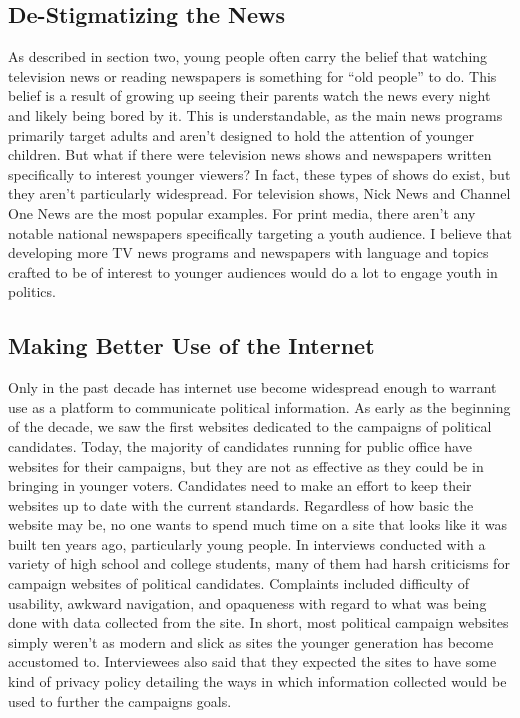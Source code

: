\documentclass[12pt,letterpaper]{article}
\begin{document}
\subsection{De-Stigmatizing the News}
As described in section two, young people often carry the belief that
watching television news or reading newspapers is something for ``old
people'' to do.  This belief is a result of growing up seeing their
parents watch the news every night and likely being bored by it.
This is understandable, as the main news programs primarily target
adults and aren't designed to hold the attention of younger children.
But what if there were television news shows and newspapers written
specifically to interest younger viewers?  In fact, these types of
shows do exist, but they aren't particularly widespread. For
television shows, Nick News and Channel One News are the most popular
examples.  For print media, there aren't any notable national
newspapers specifically targeting a youth audience. I believe that
developing more TV news programs and newspapers with language and
topics crafted to be of interest to younger audiences would do a lot
to engage youth in politics.  \cite{socia}

\subsection{Making Better Use of the Internet}
Only in the past decade has internet use become widespread enough to
warrant use as a platform to communicate political information.  As
early as the beginning of the decade, we saw the first websites
dedicated to the campaigns of political candidates.  Today, the
majority of candidates running for public office have websites for
their campaigns, but they are not as effective as they could be in
bringing in younger voters. Candidates need to make an effort to keep
their websites up to date with the current standards.  Regardless of
how basic the website may be, no one wants to spend much time on a
site that looks like it was built ten years ago, particularly young
people.  In interviews conducted with a variety of high school and
college students, many of them had harsh criticisms for campaign
websites of political candidates.  Complaints included difficulty of
usability, awkward navigation, and opaqueness with regard to what was
being done with data collected from the site.  In short, most
political campaign websites simply weren't as modern and slick as
sites the younger generation has become accustomed to.  Interviewees
also said that they expected the sites to have some kind of privacy
policy detailing the ways in which information collected would be used
to further the campaigns goals. \cite{inter}
\end{document}
